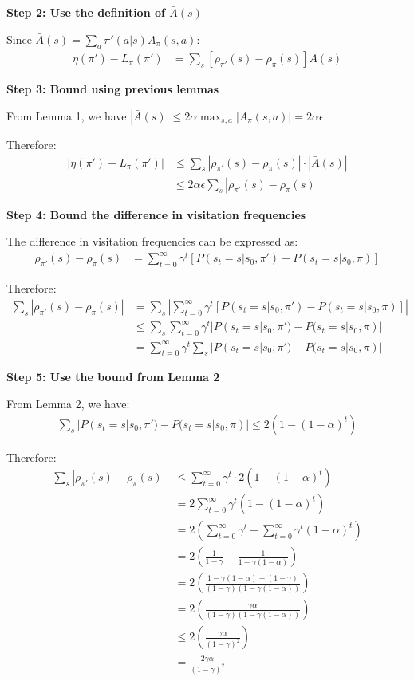\textbf{Step 2: Use the definition of $\bar{A}(s)$}

Since $\bar{A}(s) = \sum_{a}\pi'(a|s)A_{\pi}(s, a)$:
\begin{align}
\eta(\pi') - L_{\pi}(\pi') &= \sum_{s}[\rho_{\pi'}(s) - \rho_{\pi}(s)]\bar{A}(s)
\end{align}

\textbf{Step 3: Bound using previous lemmas}

From Lemma 1, we have $|\bar{A}(s)| \le 2\alpha \max_{s, a}|A_{\pi}(s,a)| = 2\alpha\epsilon$.

Therefore:
\begin{align}
|\eta(\pi') - L_{\pi}(\pi')| &\le \sum_{s} |\rho_{\pi'}(s) - \rho_{\pi}(s)| \cdot |\bar{A}(s)| \\
&\le 2\alpha\epsilon \sum_{s} |\rho_{\pi'}(s) - \rho_{\pi}(s)|
\end{align}

\textbf{Step 4: Bound the difference in visitation frequencies}

The difference in visitation frequencies can be expressed as:
\begin{align}
\rho_{\pi'}(s) - \rho_{\pi}(s) &= \sum_{t=0}^{\infty} \gamma^t [P(s_t = s | s_0, \pi') - P(s_t = s | s_0, \pi)]
\end{align}

Therefore:
\begin{align}
\sum_{s} |\rho_{\pi'}(s) - \rho_{\pi}(s)| &= \sum_{s} \left| \sum_{t=0}^{\infty} \gamma^t [P(s_t = s | s_0, \pi') - P(s_t = s | s_0, \pi)] \right| \\
&\le \sum_{s} \sum_{t=0}^{\infty} \gamma^t |P(s_t = s | s_0, \pi') - P(s_t = s | s_0, \pi)| \\
&= \sum_{t=0}^{\infty} \gamma^t \sum_{s} |P(s_t = s | s_0, \pi') - P(s_t = s | s_0, \pi)|
\end{align}

\textbf{Step 5: Use the bound from Lemma 2}

From Lemma 2, we have:
\begin{align}
\sum_{s} |P(s_t = s | s_0, \pi') - P(s_t = s | s_0, \pi)| \le 2(1-(1-\alpha)^t)
\end{align}

Therefore:
\begin{align}
\sum_{s} |\rho_{\pi'}(s) - \rho_{\pi}(s)| &\le \sum_{t=0}^{\infty} \gamma^t \cdot 2(1-(1-\alpha)^t) \\
&= 2 \sum_{t=0}^{\infty} \gamma^t (1-(1-\alpha)^t) \\
&= 2 \left( \sum_{t=0}^{\infty} \gamma^t - \sum_{t=0}^{\infty} \gamma^t (1-\alpha)^t \right) \\
&= 2 \left( \frac{1}{1-\gamma} - \frac{1}{1-\gamma(1-\alpha)} \right) \\
&= 2 \left( \frac{1-\gamma(1-\alpha) - (1-\gamma)}{(1-\gamma)(1-\gamma(1-\alpha))} \right) \\
&= 2 \left( \frac{\gamma\alpha}{(1-\gamma)(1-\gamma(1-\alpha))} \right) \\
&\le 2 \left( \frac{\gamma\alpha}{(1-\gamma)^2} \right) \\
&= \frac{2\gamma\alpha}{(1-\gamma)^2}
\end{align}

